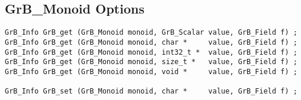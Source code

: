 \newpage
\subsection{{\sf GrB\_Monoid} Options}
\label{get_set_monoid}

\begin{mdframed}[userdefinedwidth=6in]
{\footnotesize
\begin{verbatim}
GrB_Info GrB_get (GrB_Monoid monoid, GrB_Scalar value, GrB_Field f) ;
GrB_Info GrB_get (GrB_Monoid monoid, char *     value, GrB_Field f) ;
GrB_Info GrB_get (GrB_Monoid monoid, int32_t *  value, GrB_Field f) ;
GrB_Info GrB_get (GrB_Monoid monoid, size_t *   value, GrB_Field f) ;
GrB_Info GrB_get (GrB_Monoid monoid, void *     value, GrB_Field f) ;

GrB_Info GrB_set (GrB_Monoid monoid, char *     value, GrB_Field f) ;
\end{verbatim}
}\end{mdframed}



